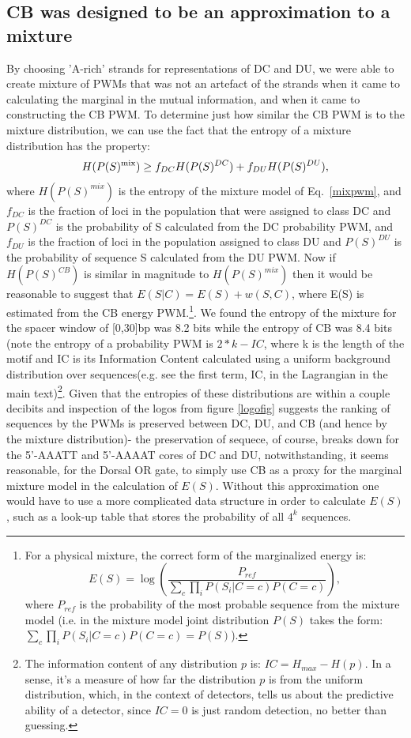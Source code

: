  \subsection{CB was designed to be an approximation to a mixture}\label{just}
By choosing 'A-rich' strands for representations of DC and DU, we were able to create mixture of PWMs that was not an artefact of the strands when it came to calculating the marginal in the mutual information, and when it came to constructing the CB PWM.  To determine just how similar the CB PWM is to the mixture distribution, we can use the fact that the entropy of a mixture distribution has the property:
\begin{equation}
H(P(S)^{\rm mix}) \geq f_{DC} H(P(S)^{DC}) + f_{DU} H(P(S)^{DU}),
\end{equation}
where $H( P(S)^{mix})$ is the entropy of the mixture model of Eq.~\ref{mixpwm}, and $f_{DC}$ is the fraction of loci in the population that were assigned to class DC and $P(S)^{DC}$ is the probability of S calculated from the DC probability PWM, and $f_{DU}$ is the fraction of loci in the population assigned to class DU and $P(S)^{DU}$ is the probability of sequence S calculated from the DU PWM.  Now if $H(P(S)^{CB})$ is similar in magnitude to $H(P(S)^{mix})$ then it would be reasonable to suggest that $E(S|C) =E(S) + w(S,C)$, where E(S) is estimated from the CB energy PWM.\footnote{ For a physical mixture, the correct form of the marginalized energy is: 
\begin{equation}
E(S)=\log{(\frac{P_{ref}}{\sum_{c}\prod_i P(S_i|C=c)P(C=c)})},
\end{equation}
where $P_{ref}$ is the probability of the most probable sequence from the mixture model (i.e. in the mixture model joint distribution $P(S)$ takes the form: $\sum_{c}\prod_i P(S_i|C=c)P(C=c)= P(S)$).}.  We found the entropy of the mixture for the spacer window of [0,30]bp was 8.2 bits while the entropy of CB was 8.4 bits (note the entropy of a probability PWM is $2*k-IC$, where k is the length of the motif and IC is its Information Content calculated using a uniform background distribution over sequences(e.g. see the first term, IC, in the Lagrangian in the main text)\footnote{The information content of any distribution $p$ is: $IC = H_{max} - H(p)$.  In a sense, it's a measure of how far the distribution $p$ is from the uniform distribution, which, in the context of detectors, tells us about the predictive ability of a detector, since $IC=0$ is just random detection, no better than guessing.}.  Given that the entropies of these distributions are within a couple decibits and inspection of the logos from figure \ref{logofig} suggests the ranking of sequences by the PWMs is preserved between DC, DU, and CB (and hence by the mixture distribution)- the preservation of sequece, of course, breaks down for the 5'-AAATT and 5'-AAAAT cores of DC and DU, notwithstanding, it seems reasonable, for the Dorsal OR gate, to simply use CB as a proxy for the marginal mixture model in the calculation of $E(S)$.  Without this approximation one would have to use a more complicated data structure in order to calculate $E(S)$, such as a look-up table that stores the probability of all $4^k$ sequences. 
 
